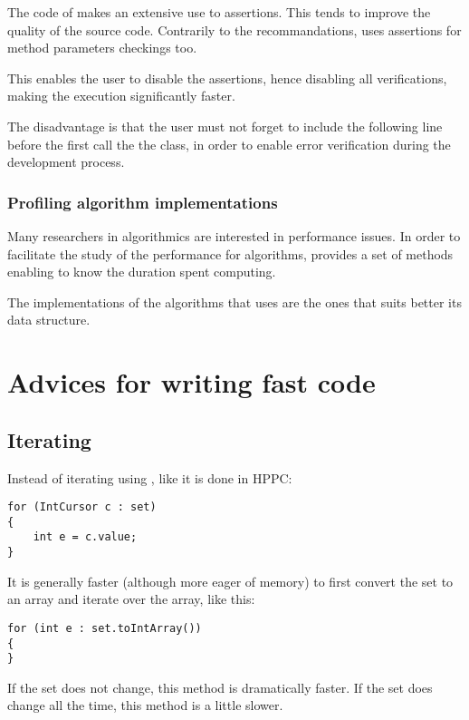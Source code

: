 \documentclass{article}
\begin{document}
The code of \grph makes an extensive use to assertions. This tends to improve the quality of the source code.
Contrarily to the recommandations, \grph uses assertions for method parameters checkings too.

This enables the user to disable the assertions, hence disabling all verifications, making the execution significantly faster.

The disadvantage is that the user must not forget to include the following line before the first call
the the  class, in order to enable error verification during the development process.

		


\subsubsection{Profiling algorithm implementations}

Many researchers in algorithmics are interested in performance issues. In order to facilitate the study of the performance for
algorithms, \grph provides a set of methods enabling to know the duration spent computing. 

The implementations of the algorithms that \grph uses are the ones that suits better its data structure.

		

\section{Advices for writing fast code}

\subsection{Iterating}

Instead of iterating using , like it is done in HPPC:
\begin{lstlisting}
for (IntCursor c : set)
{
	int e = c.value;
}
\end{lstlisting}
It is generally faster (although more eager of memory) to first convert the set to an array and iterate over the array, like this:
\begin{lstlisting}
for (int e : set.toIntArray())
{
}
\end{lstlisting}
If the set does not change, this method is dramatically faster. If the set does change all the time, this method is a little slower.
\end{document}
